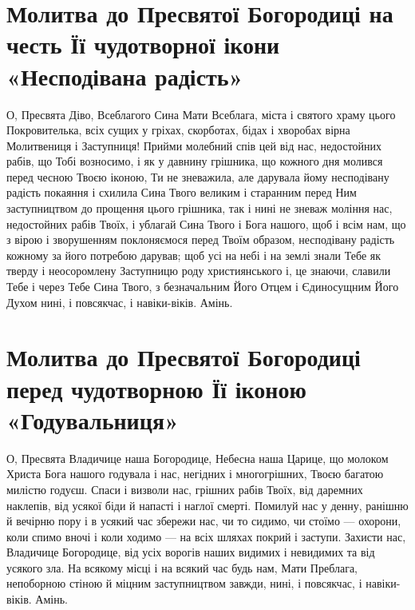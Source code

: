 \documentclass[chapters.tex]{subfiles}
\begin{document}
\section{Молитва до Пресвятої Богородиці на честь Її чудотворної ікони «Несподівана радість»}
О, Пресвята Діво, Всеблагого Сина Мати Всеблага, міста і святого храму цього Покровителька, всіх сущих у гріхах, скорботах, бідах і хворобах вірна Молитвениця і Заступниця! Прийми молебний спів цей від нас, недостойних рабів, що Тобі возносимо, і як у давнину грішника, що кожного дня молився перед чесною Твоєю іконою, Ти не зневажила, але дарувала йому несподівану радість покаяння і схилила Сина Твого великим і старанним перед Ним заступництвом до прощення цього грішника, так і нині не зневаж моління нас, недостойних рабів Твоїх, і ублагай Сина Твого і Бога нашого, щоб і всім нам, що з вірою і зворушенням поклоняємося перед Твоїм образом, несподівану радість кожному за його потребою дарував; щоб усі на небі і на землі знали Тебе як тверду і неосоромлену Заступницю роду християнського і, це знаючи, славили Тебе і через Тебе Сина Твого, з безначальним Його Отцем і Єдиносущним Його Духом нині, і повсякчас, і навіки-віків. Амінь.

\section{Молитва до Пресвятої Богородиці перед чудотворною Її іконою «Годувальниця»}
О, Пресвята Владичице наша Богородице, Небесна наша Царице, що молоком Христа Бога нашого годувала і нас, негідних і многогрішних, Твоєю багатою милістю годуєш. Спаси і визволи нас, грішних рабів Твоїх, від даремних наклепів, від усякої біди й напасті і наглої смерті. Помилуй нас у денну, ранішню й вечірню пору і в усякий час збережи нас, чи то сидимо, чи стоїмо — охорони, коли спимо вночі і коли ходимо — на всіх шляхах покрий і заступи. Захисти нас, Владичице Богородице, від усіх ворогів наших видимих і невидимих та від усякого зла. На всякому місці і на всякий час будь нам, Мати Преблага, непоборною стіною й міцним заступництвом завжди, нині, і повсякчас, і навіки-віків. Амінь.
\end{document}
